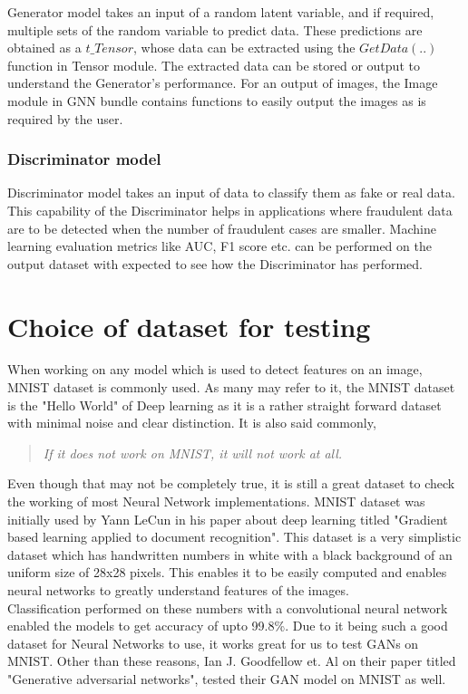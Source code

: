 \documentclass[conference]{IEEEtran}
\begin{document}
Generator model takes an input of a random latent variable, and if required, multiple sets of the random variable to predict data. These predictions are obtained as a $t\_Tensor$, whose data can be extracted using the $GetData(..)$ function in Tensor module. The extracted data can be stored or output to understand the Generator's performance. For an output of images, the Image module in GNN bundle contains functions to easily output the images as is required by the user. 

\subsubsection{\textbf{Discriminator model}}

Discriminator model takes an input of data to classify them as fake or real data. This capability of the Discriminator helps in applications where fraudulent data are to be detected when the number of fraudulent cases are smaller. Machine learning evaluation metrics like AUC, F1 score etc. can be performed on the output dataset with expected to see how the Discriminator has performed.

\section{Choice of dataset for testing}

When working on any model which is used to detect features on an image, MNIST dataset is commonly used. As many may refer to it, the MNIST dataset is the "Hello World" of Deep learning as it is a rather straight forward dataset with minimal noise and clear distinction. It is also said commonly, \begin{quote}
    \textit{If it does not work on MNIST, it will not work at all.}
\end{quote}

Even though that may not be completely true, it is still a great dataset to check the working of most Neural Network implementations. MNIST dataset was initially used by Yann LeCun in his paper about deep learning titled "Gradient based learning applied to document recognition"\cite{lecunmnist}. This dataset is a very simplistic dataset which has handwritten numbers in white with a black background of an uniform size of 28x28 pixels. This enables it to be easily computed and enables neural networks to greatly understand features of the images. 
\\
Classification performed on these numbers with a convolutional neural network enabled the models to get accuracy of upto 99.8\%\cite{mnistdetect}. Due to it being such a good dataset for Neural Networks to use, it works great for us to test GANs on MNIST. Other than these reasons, Ian J. Goodfellow et. Al on their paper titled "Generative adversarial networks", tested their GAN model on MNIST as well\cite{iangan}.
\end{document}
